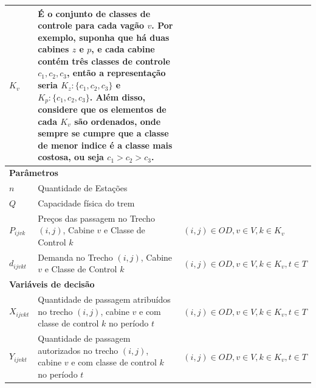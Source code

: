 \begin{table}[H]
\begin{tabular}{p{2cm} p{9.5cm} p{3.2cm}}
		$K_v$              & É o conjunto de classes de controle para cada vagão $v$. Por exemplo, suponha que há duas cabines $z$ e $p$, e cada cabine contém três classes de controle $c_1, c_2, c_3$, então a representação seria $K_z:\{c_1,c_2,c_3\}$ e $K_p:\{c_1,c_2,c_3\}$. Além disso, considere que os elementos de cada $K_v$ são ordenados, onde sempre se cumpre que a classe de menor indice é a classe mais costosa, ou seja $c_1>c_2>c_3$.                                                                                                        &                                              \\ \midrule
		\multicolumn{3}{l}{\textbf{Parâmetros}}                                                                                                                                                                                         \\ \midrule
		$n$                & Quantidade de Estações                                                                                                                                                 &                                              \\
		$Q$                & Capacidade física do trem                                                                                                                                          &                                              \\
		$P_{ijvk}$         & Preços  das passagem no Trecho $(i,j)$, Cabine $v$ e Classe de Control $k$                                                                                  & $(i,j) \in OD,v \in V, k \in K_v$            \\
		$d_{ijvkt}$        & Demanda no Trecho $(i,j)$, Cabine $v$ e Classe de Control $k$                                                                                 & $(i,j) \in OD,v \in V, k \in K_v, t \in T$   \\ \midrule
		\multicolumn{3}{l}{\textbf{Variáveis de decisão}}                                                                                                                                                                               \\ \midrule
		$X_{ijvkt}$        & Quantidade de passagem atribuídos no trecho $(i,j)$, cabine $v$ e com classe de control $k$ no período $t$                                                  & $(i,j) \in OD, v \in V, k \in K_v, t \in T$  \\
		$Y_{ijvkt}$        & Quantidade de passagem autorizados no trecho $(i,j)$, cabine $v$ e com classe de control $k$ no período $t$                                                 & $(i,j) \in OD, v \in V, k \in K_v, t \in T$  \\

\end{tabular}
\end{table}
